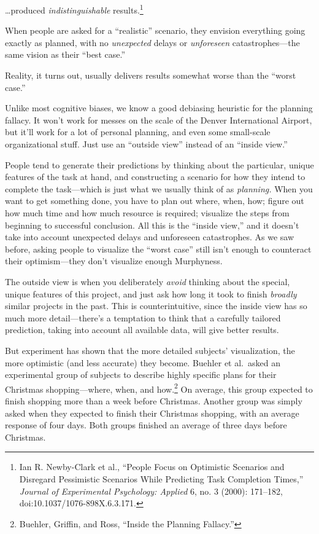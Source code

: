{
 \ldots produced \textit{indistinguishable}
results.\footnote{Ian R. Newby-Clark et al., ``People Focus on
Optimistic Scenarios and Disregard Pessimistic Scenarios While
Predicting Task Completion Times,'' \textit{Journal
of Experimental Psychology: Applied} 6, no. 3 (2000): 171--182,
doi:10.1037/1076-898X.6.3.171.}}

{
 When people are asked for a
``realistic'' scenario, they
envision everything going exactly as planned, with no
\textit{unexpected} delays or \textit{unforeseen} catastrophes---the
same vision as their ``best case.''}

{
 Reality, it turns out, usually delivers results somewhat worse
than the ``worst case.''}

{
 Unlike most cognitive biases, we know a good debiasing heuristic
for the planning fallacy. It won't work for messes on
the scale of the Denver International Airport, but
it'll work for a lot of personal planning, and even
some small-scale organizational stuff. Just use an
``outside view'' instead of an
``inside view.''}

{
 People tend to generate their predictions by thinking about the
particular, unique features of the task at hand, and constructing a
scenario for how they intend to complete the task---which is just what
we usually think of as \textit{planning.} When you want to get
something done, you have to plan out where, when, how; figure out how
much time and how much resource is required; visualize the steps from
beginning to successful conclusion. All this is the
``inside view,'' and it
doesn't take into account unexpected delays and
unforeseen catastrophes. As we saw before, asking people to visualize
the ``worst case'' still
isn't enough to counteract their optimism---they
don't visualize enough Murphyness.}

{
 The outside view is when you deliberately \textit{avoid} thinking
about the special, unique features of this project, and just ask how
long it took to finish \textit{broadly} similar projects in the past.
This is counterintuitive, since the inside view has so much more
detail---there's a temptation to think that a carefully
tailored prediction, taking into account all available data, will give
better results.}

{
 But experiment has shown that the more detailed
subjects' visualization, the more optimistic (and less
accurate) they become. Buehler et al.~asked an experimental group of
subjects to describe highly specific plans for their Christmas
shopping---where, when, and how.\footnote{Buehler, Griffin, and Ross, ``Inside the
Planning Fallacy.''} On average, this
group expected to finish shopping more than a week before Christmas.
Another group was simply asked when they expected to finish their
Christmas shopping, with an average response of four days. Both groups
finished an average of three days before Christmas.}

